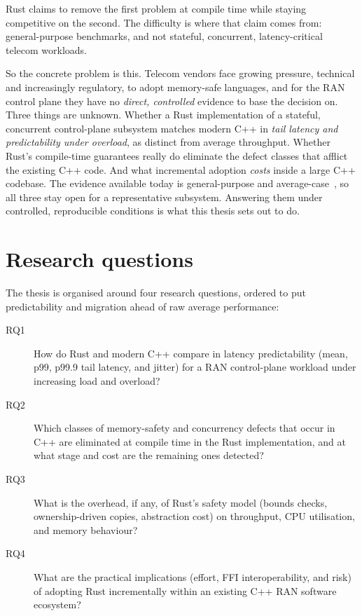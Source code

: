 \documentclass[english,twoside,openright,a4paper,censored,csm,software-track-2020]{HYthesisML}
\begin{document}
Rust claims to remove the first problem at compile time while staying competitive on the
second. The difficulty is where that claim comes from: general-purpose benchmarks, and not
stateful, concurrent, latency-critical telecom workloads.

So the concrete problem is this. Telecom vendors face growing pressure, technical and
increasingly regulatory, to adopt memory-safe languages, and for the RAN control plane they
have no \emph{direct, controlled} evidence to base the decision on. Three things are unknown.
Whether a Rust implementation of a stateful, concurrent control-plane subsystem matches modern
C++ in \emph{tail latency and predictability under overload}, as distinct from average
throughput. Whether Rust's compile-time guarantees really do eliminate the defect classes that
afflict the existing C++ code. And what incremental adoption \emph{costs} inside a large C++
codebase. The evidence available today is general-purpose and
average-case~\cite{balasubramanian2017rust,qin2020rust}, so all three stay open for a
representative subsystem. Answering them under controlled, reproducible conditions is what
this thesis sets out to do.

\section{Research questions}
The thesis is organised around four research questions, ordered to put predictability and
migration ahead of raw average performance:

\begin{description}
  \item[RQ1] How do Rust and modern C++ compare in latency predictability (mean, p99,
        p99.9 tail latency, and jitter) for a RAN control-plane workload under increasing
        load and overload?
  \item[RQ2] Which classes of memory-safety and concurrency defects that occur in C++ are
        eliminated at compile time in the Rust implementation, and at what stage and cost
        are the remaining ones detected?
  \item[RQ3] What is the overhead, if any, of Rust's safety model (bounds checks,
        ownership-driven copies, abstraction cost) on throughput, CPU utilisation, and
        memory behaviour?
  \item[RQ4] What are the practical implications (effort, FFI interoperability, and risk)
        of adopting Rust incrementally within an existing C++ RAN software ecosystem?
\end{description}
\end{document}

